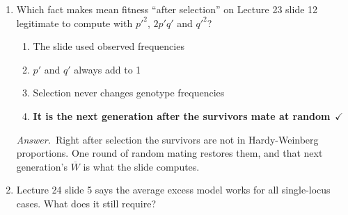 \documentclass[11pt]{article}
\newcommand{\keyans}[1]{\par\medskip\noindent\textit{Answer.}\ #1\par\medskip}
\begin{document}
\begin{enumerate}[label=\textbf{\arabic*.}, leftmargin=2em, itemsep=1.4em]
\begin{enumerate}[label={}, leftmargin=2.4em, labelwidth=0pt, itemsep=2pt, topsep=0pt]
\item \hspace*{-2.4em}It is a convention with no reason
\item \hspace*{-2.4em}Because \(s_1\) is always larger
\item \hspace*{-2.4em}Because the heterozygote has \(s\) = 0
\end{enumerate}
\keyans{Setting the two alleles' average fitnesses equal gives \(p \cdot s_1\) = \(q \cdot s_2\). Each allele loses the same amount through its own homozygote, so a harsher homozygote must be visited less often.}
\item Which fact makes mean fitness ``after selection'' on Lecture 23 slide 12 legitimate to compute with \(p'^{2}\), \(2p'q'\) and \(q'^{2}\)?
\nopagebreak\par{}
\par\smallskip
\begin{enumerate}[label={}, leftmargin=2.4em, labelwidth=0pt, itemsep=2pt, topsep=0pt]
\item \hspace*{-2.4em}The slide used observed frequencies
\item \hspace*{-2.4em}\(p'\) and \(q'\) always add to 1
\item \hspace*{-2.4em}Selection never changes genotype frequencies
\item \hspace*{-2.4em}\textbf{It is the next generation after the survivors mate at random}\ \(\checkmark\)
\end{enumerate}
\keyans{Right after selection the survivors are not in Hardy-Weinberg proportions. One round of random mating restores them, and that next generation's \(\overline{W}\) is what the slide computes.}
\item Lecture 24 slide 5 says the average excess model works for all single-locus cases. What does it still require?
\nopagebreak\par{}
\par\smallskip
\begin{enumerate}[label={}, leftmargin=2.4em, labelwidth=0pt, itemsep=2pt, topsep=0pt]

\end{enumerate}
\end{enumerate}
\end{document}
